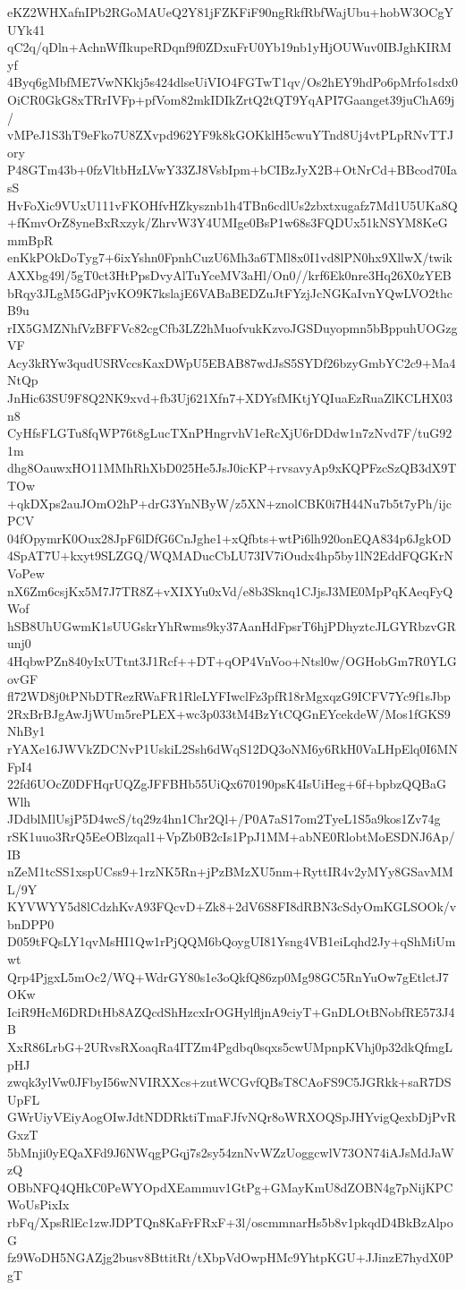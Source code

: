 eKZ2WHXafnIPb2RGoMAUeQ2Y81jFZKFiF90ngRkfRbfWajUbu+hobW3OCgYUYk41
qC2q/qDln+AchnWfIkupeRDqnf9f0ZDxuFrU0Yb19nb1yHjOUWuv0IBJghKIRMyf
4Byq6gMbfME7VwNKkj5s424dlseUiVIO4FGTwT1qv/Os2hEY9hdPo6pMrfo1sdx0
OiCR0GkG8xTRrIVFp+pfVom82mkIDIkZrtQ2tQT9YqAPI7Gaanget39juChA69j/
vMPeJ1S3hT9eFko7U8ZXvpd962YF9k8kGOKklH5cwuYTnd8Uj4vtPLpRNvTTJory
P48GTm43b+0fzVltbHzLVwY33ZJ8VsbIpm+bCIBzJyX2B+OtNrCd+BBcod70IasS
HvFoXic9VUxU111vFKOHfvHZkysznb1h4TBn6cdlUs2zbxtxugafz7Md1U5UKa8Q
+fKmvOrZ8yneBxRxzyk/ZhrvW3Y4UMIge0BsP1w68s3FQDUx51kNSYM8KeGmmBpR
enKkPOkDoTyg7+6ixYshn0FpnhCuzU6Mh3a6TMl8x0I1vd8lPN0hx9XllwX/twik
AXXbg49l/5gT0ct3HtPpsDvyAlTuYceMV3aHl/On0//krf6Ek0nre3Hq26X0zYEB
bRqy3JLgM5GdPjvKO9K7kslajE6VABaBEDZuJtFYzjJcNGKaIvnYQwLVO2thcB9u
rIX5GMZNhfVzBFFVc82cgCfb3LZ2hMuofvukKzvoJGSDuyopmn5bBppuhUOGzgVF
Acy3kRYw3qudUSRVccsKaxDWpU5EBAB87wdJsS5SYDf26bzyGmbYC2c9+Ma4NtQp
JnHic63SU9F8Q2NK9xvd+fb3Uj621Xfn7+XDYsfMKtjYQIuaEzRuaZlKCLHX03n8
CyHfsFLGTu8fqWP76t8gLucTXnPHngrvhV1eRcXjU6rDDdw1n7zNvd7F/tuG921m
dhg8OauwxHO11MMhRhXbD025He5JsJ0icKP+rvsavyAp9xKQPFzcSzQB3dX9TTOw
+qkDXps2auJOmO2hP+drG3YnNByW/z5XN+znolCBK0i7H44Nu7b5t7yPh/ijcPCV
04fOpymrK0Oux28JpF6lDfG6CnJghe1+xQfbts+wtPi6lh920onEQA834p6JgkOD
4SpAT7U+kxyt9SLZGQ/WQMADucCbLU73IV7iOudx4hp5by1lN2EddFQGKrNVoPew
nX6Zm6csjKx5M7J7TR8Z+vXIXYu0xVd/e8b3Sknq1CJjsJ3ME0MpPqKAeqFyQWof
hSB8UhUGwmK1sUUGskrYhRwms9ky37AanHdFpsrT6hjPDhyztcJLGYRbzvGRunj0
4HqbwPZn840yIxUTtnt3J1Rcf++DT+qOP4VnVoo+Ntsl0w/OGHobGm7R0YLGovGF
fl72WD8j0tPNbDTRezRWaFR1RleLYFIwclFz3pfR18rMgxqzG9ICFV7Yc9f1sJbp
2RxBrBJgAwJjWUm5rePLEX+wc3p033tM4BzYtCQGnEYcekdeW/Mos1fGKS9NhBy1
rYAXe16JWVkZDCNvP1UskiL2Ssh6dWqS12DQ3oNM6y6RkH0VaLHpElq0I6MNFpI4
22fd6UOcZ0DFHqrUQZgJFFBHb55UiQx670190psK4IsUiHeg+6f+bpbzQQBaGWlh
JDdblMlUsjP5D4wcS/tq29z4hn1Chr2Ql+/P0A7aS17om2TyeL1S5a9kos1Zv74g
rSK1uuo3RrQ5EeOBlzqal1+VpZb0B2cIs1PpJ1MM+abNE0RlobtMoESDNJ6Ap/IB
nZeM1tcSS1xspUCss9+1rzNK5Rn+jPzBMzXU5nm+RyttIR4v2yMYy8GSavMML/9Y
KYVWYY5d8lCdzhKvA93FQcvD+Zk8+2dV6S8FI8dRBN3cSdyOmKGLSOOk/vbnDPP0
D059tFQsLY1qvMsHI1Qw1rPjQQM6bQoygUI81Ysng4VB1eiLqhd2Jy+qShMiUmwt
Qrp4PjgxL5mOc2/WQ+WdrGY80s1e3oQkfQ86zp0Mg98GC5RnYuOw7gEtlctJ7OKw
IciR9HcM6DRDtHb8AZQcdShHzcxIrOGHylfljnA9ciyT+GnDLOtBNobfRE573J4B
XxR86LrbG+2URvsRXoaqRa4ITZm4Pgdbq0sqxs5cwUMpnpKVhj0p32dkQfmgLpHJ
zwqk3ylVw0JFbyI56wNVIRXXcs+zutWCGvfQBsT8CAoFS9C5JGRkk+saR7DSUpFL
GWrUiyVEiyAogOIwJdtNDDRktiTmaFJfvNQr8oWRXOQSpJHYvigQexbDjPvRGxzT
5bMnji0yEQaXFd9J6NWqgPGqj7s2sy54znNvWZzUoggcwlV73ON74iAJsMdJaWzQ
OBbNFQ4QHkC0PeWYOpdXEammuv1GtPg+GMayKmU8dZOBN4g7pNijKPCWoUsPixIx
rbFq/XpsRlEc1zwJDPTQn8KaFrFRxF+3l/oscmmnarHs5b8v1pkqdD4BkBzAlpoG
fz9WoDH5NGAZjg2busv8BttitRt/tXbpVdOwpHMc9YhtpKGU+JJinzE7hydX0PgT
